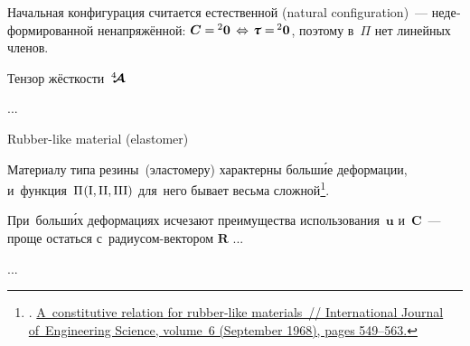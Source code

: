 \begin{otherlanguage}{russian}

\noindent Начальная конфигурация считается естественной (natural configuration)~--- недеформированной ненапряжённой: ${\bm{C} = \hspace{-0.1ex} {^2\bm{0}} \hspace{.4ex} \Leftrightarrow \hspace{.2ex} \cauchystress = \hspace{-0.2ex} {^2\bm{0}}}$, поэтому в~$\Pi$ нет линейных членов.

Тензор жёсткости~$\hspace{.08ex}{^4\hspace{-0.72ex}\bm{\mathcal{A}}}\hspace{.08ex}$

...

Rubber\hbox{-}like material (elastomer)

Материалу типа резины~(эластомеру) характерны больш\'{и}е деформации, и~функция~${\Pi\hspace{.12ex}(\mathrm{I}, \mathrm{II}, \mathrm{III})}$ для~него бывает весьма сложной\footnote{. \href{https://kundoc.com/pdf-a-constitutive-relation-for-rubber-like-materials-.html}{A~constitutive relation for rubber-like ma\-te\-ri\-als~// International Journal of~Engineering Science, volume~6 (September 1968), pages 549\hbox{--}563.}}\hbox{\hspace{-0.5ex}.}

При~больш\'{и}х деформациях исчезают преимущества использования~$\bm{u}$ и~$\bm{C}$~--- проще остаться с~радиусом\hbox{-}вектором $\bm{R}$ ...

...



\end{otherlanguage}

\newpage



\label{para:piolakirchhoffstresstensor}

